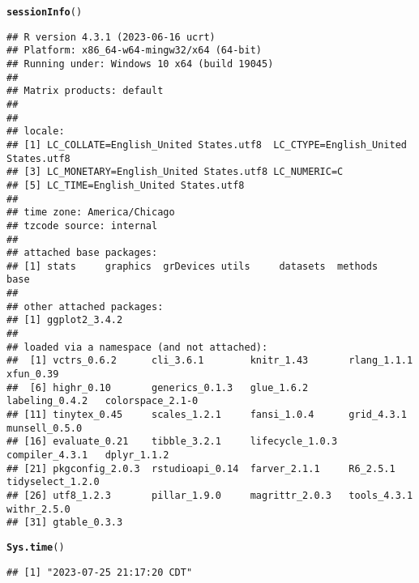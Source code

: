 \documentclass{article}\usepackage[]{graphicx}\usepackage[]{xcolor}
\makeatletter
\newcommand{\hlstd}[1]{\textcolor[rgb]{0.345,0.345,0.345}{#1}}%
\newcommand{\hlkwd}[1]{\textcolor[rgb]{0.737,0.353,0.396}{\textbf{#1}}}%
\newenvironment{kframe}{%
 \def\at@end@of@kframe{}%
 \ifinner\ifhmode%
  \def\at@end@of@kframe{\end{minipage}}%
  \begin{minipage}{\columnwidth}%
 \fi\fi%
 \def\FrameCommand##1{\hskip\@totalleftmargin \hskip-\fboxsep
 \colorbox{shadecolor}{##1}\hskip-\fboxsep
     \hskip-\linewidth \hskip-\@totalleftmargin \hskip\columnwidth}%
 \MakeFramed {\advance\hsize-\width
   \@totalleftmargin\z@ \linewidth\hsize
   \@setminipage}}%
 {\par\unskip\endMakeFramed%
 \at@end@of@kframe}
\newenvironment{knitrout}{}{} %
\makeatother
\begin{document}
\begin{knitrout}
\color{fgcolor}\begin{kframe}
\begin{alltt}
\hlkwd{sessionInfo}\hlstd{()}
\end{alltt}
\begin{verbatim}
## R version 4.3.1 (2023-06-16 ucrt)
## Platform: x86_64-w64-mingw32/x64 (64-bit)
## Running under: Windows 10 x64 (build 19045)
## 
## Matrix products: default
## 
## 
## locale:
## [1] LC_COLLATE=English_United States.utf8  LC_CTYPE=English_United States.utf8   
## [3] LC_MONETARY=English_United States.utf8 LC_NUMERIC=C                          
## [5] LC_TIME=English_United States.utf8    
## 
## time zone: America/Chicago
## tzcode source: internal
## 
## attached base packages:
## [1] stats     graphics  grDevices utils     datasets  methods   base     
## 
## other attached packages:
## [1] ggplot2_3.4.2
## 
## loaded via a namespace (and not attached):
##  [1] vctrs_0.6.2      cli_3.6.1        knitr_1.43       rlang_1.1.1      xfun_0.39       
##  [6] highr_0.10       generics_0.1.3   glue_1.6.2       labeling_0.4.2   colorspace_2.1-0
## [11] tinytex_0.45     scales_1.2.1     fansi_1.0.4      grid_4.3.1       munsell_0.5.0   
## [16] evaluate_0.21    tibble_3.2.1     lifecycle_1.0.3  compiler_4.3.1   dplyr_1.1.2     
## [21] pkgconfig_2.0.3  rstudioapi_0.14  farver_2.1.1     R6_2.5.1         tidyselect_1.2.0
## [26] utf8_1.2.3       pillar_1.9.0     magrittr_2.0.3   tools_4.3.1      withr_2.5.0     
## [31] gtable_0.3.3
\end{verbatim}
\begin{alltt}
\hlkwd{Sys.time}\hlstd{()}
\end{alltt}
\begin{verbatim}
## [1] "2023-07-25 21:17:20 CDT"
\end{verbatim}
\end{kframe}
\end{knitrout}
\end{document}

